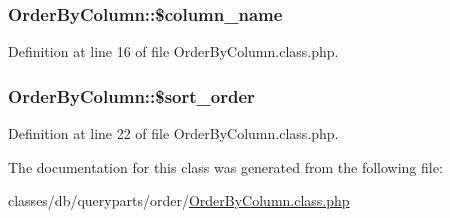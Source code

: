 \subsubsection[{\$column\+\_\+name}]{\setlength{\rightskip}{0pt plus 5cm}Order\+By\+Column\+::\$column\+\_\+name}\label{classOrderByColumn_a4c1243e9acca95ecc01d0a37856be6e1}


Definition at line 16 of file Order\+By\+Column.\+class.\+php.

\hypertarget{classOrderByColumn_ad62eb7e1435d62f643135df8094efba5}{}
\subsubsection[{\$sort\+\_\+order}]{\setlength{\rightskip}{0pt plus 5cm}Order\+By\+Column\+::\$sort\+\_\+order}\label{classOrderByColumn_ad62eb7e1435d62f643135df8094efba5}


Definition at line 22 of file Order\+By\+Column.\+class.\+php.



The documentation for this class was generated from the following file\+:\begin{DoxyCompactItemize}
\item 
classes/db/queryparts/order/\hyperlink{OrderByColumn_8class_8php}{Order\+By\+Column.\+class.\+php}\end{DoxyCompactItemize}
